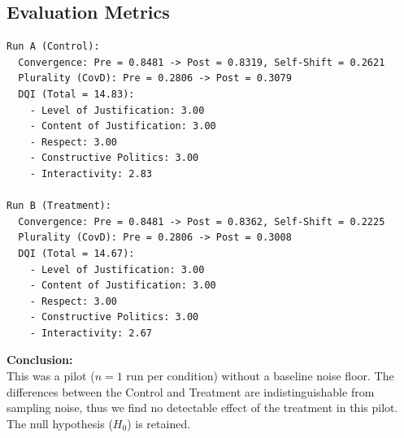 \documentclass[titlepage]{article}
\begin{document}
\subsection{Evaluation Metrics}
\begin{tcolorbox}[colback=gray!5!white,colframe=gray!75!black,title=Analysis]
\begin{verbatim}
Run A (Control):
  Convergence: Pre = 0.8481 -> Post = 0.8319, Self-Shift = 0.2621
  Plurality (CovD): Pre = 0.2806 -> Post = 0.3079
  DQI (Total = 14.83):
    - Level of Justification: 3.00
    - Content of Justification: 3.00
    - Respect: 3.00
    - Constructive Politics: 3.00
    - Interactivity: 2.83

Run B (Treatment):
  Convergence: Pre = 0.8481 -> Post = 0.8362, Self-Shift = 0.2225
  Plurality (CovD): Pre = 0.2806 -> Post = 0.3008
  DQI (Total = 14.67):
    - Level of Justification: 3.00
    - Content of Justification: 3.00
    - Respect: 3.00
    - Constructive Politics: 3.00
    - Interactivity: 2.67
\end{verbatim}
\vspace{0.5em}
\textbf{Conclusion:}\\
This was a pilot ($n=1$ run per condition) without a baseline noise floor. The differences between the Control and Treatment are indistinguishable from sampling noise, thus we find no detectable effect of the treatment in this pilot. The null hypothesis ($H_0$) is retained.
\end{tcolorbox}
\end{document}
